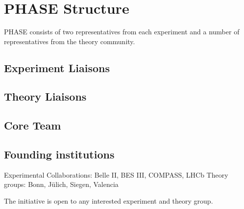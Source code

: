 \section{PHASE Structure}
PHASE consists of two representatives from each experiment and a number of representatives from the theory community. 

\subsection{Experiment Liaisons}

\subsection{Theory Liaisons}

\subsection{Core Team}

\subsection{Founding institutions}
Experimental Collaborations: Belle II, BES III, COMPASS, LHCb 
Theory groups: Bonn, J\"ulich, Siegen, Valencia

The initiative is open to any interested experiment and theory group.
